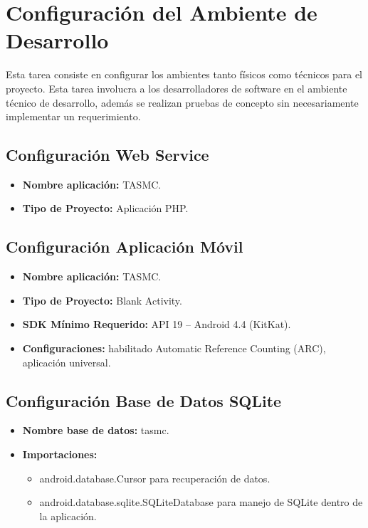 
\chapter{Configuración del Ambiente de Desarrollo} %

\label{ConfiguracionAmbienteDesarrollo} %


Esta tarea consiste en configurar los ambientes tanto físicos como técnicos para el proyecto. Esta tarea involucra a los desarrolladores de software en el ambiente técnico de desarrollo, además se realizan pruebas de concepto sin necesariamente implementar un requerimiento.

\section{Configuración Web Service}

\begin{itemize}
	\item \textbf{Nombre aplicación: } TASMC.
	\item \textbf{Tipo de Proyecto: } Aplicación PHP.
\end{itemize}

\section{Configuración Aplicación Móvil }

\begin{itemize}
	\item \textbf{Nombre aplicación: } TASMC.
	\item \textbf{Tipo de Proyecto: } Blank Activity.
	\item \textbf{SDK Mínimo Requerido: } API 19 – Android 4.4 (KitKat).
	\item \textbf{Configuraciones: } habilitado Automatic Reference Counting (ARC), aplicación universal.
\end{itemize}

\section{Configuración Base de Datos SQLite}

\begin{itemize}
	\item \textbf{Nombre base de datos: } tasmc.
	\item \textbf{Importaciones: }
	\begin{itemize}
		\item android.database.Cursor para recuperación de datos.
		\item android.database.sqlite.SQLiteDatabase para manejo de SQLite dentro de la aplicación.
	\end{itemize}
\end{itemize}

